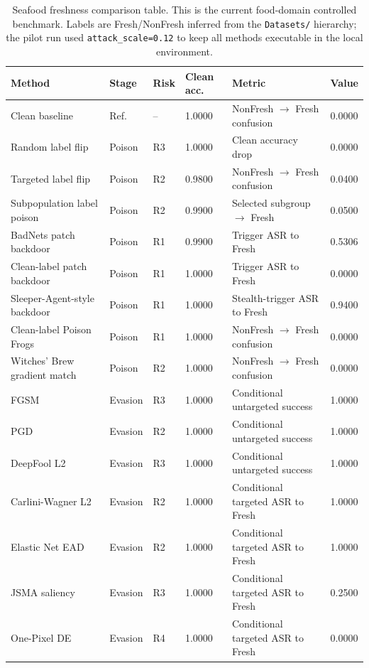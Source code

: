 \documentclass[conference]{IEEEtran}
\begin{document}
\begin{table}[t]
\centering
\caption{Seafood freshness comparison table. This is the current food-domain controlled benchmark. Labels are Fresh/NonFresh inferred from the \texttt{Datasets/} hierarchy; the pilot run used \texttt{attack\_scale=0.12} to keep all methods executable in the local environment.}
\label{tab:seafoodresults}
\small
\begin{tabular}{p{}p{}p{}p{}p{}p{}}
\toprule
Method & Stage & Risk & Clean acc. & Metric & Value \\
\midrule
Clean baseline & Ref. & -- & 1.0000 & NonFresh \(\rightarrow\) Fresh confusion & 0.0000 \\
Random label flip & Poison & R3 & 1.0000 & Clean accuracy drop & 0.0000 \\
Targeted label flip & Poison & R2 & 0.9800 & NonFresh \(\rightarrow\) Fresh confusion & 0.0400 \\
Subpopulation label poison & Poison & R2 & 0.9900 & Selected subgroup \(\rightarrow\) Fresh & 0.0500 \\
BadNets patch backdoor & Poison & R1 & 0.9900 & Trigger ASR to Fresh & 0.5306 \\
Clean-label patch backdoor & Poison & R1 & 1.0000 & Trigger ASR to Fresh & 0.0000 \\
Sleeper-Agent-style backdoor & Poison & R1 & 1.0000 & Stealth-trigger ASR to Fresh & 0.9400 \\
Clean-label Poison Frogs & Poison & R1 & 1.0000 & NonFresh \(\rightarrow\) Fresh confusion & 0.0000 \\
Witches' Brew gradient match & Poison & R2 & 1.0000 & NonFresh \(\rightarrow\) Fresh confusion & 0.0000 \\
FGSM & Evasion & R3 & 1.0000 & Conditional untargeted success & 1.0000 \\
PGD & Evasion & R2 & 1.0000 & Conditional untargeted success & 1.0000 \\
DeepFool L2 & Evasion & R3 & 1.0000 & Conditional untargeted success & 1.0000 \\
Carlini-Wagner L2 & Evasion & R2 & 1.0000 & Conditional targeted ASR to Fresh & 1.0000 \\
Elastic Net EAD & Evasion & R2 & 1.0000 & Conditional targeted ASR to Fresh & 1.0000 \\
JSMA saliency & Evasion & R3 & 1.0000 & Conditional targeted ASR to Fresh & 0.2500 \\
One-Pixel DE & Evasion & R4 & 1.0000 & Conditional targeted ASR to Fresh & 0.0000 \\

\end{tabular}
\end{table}
\end{document}
